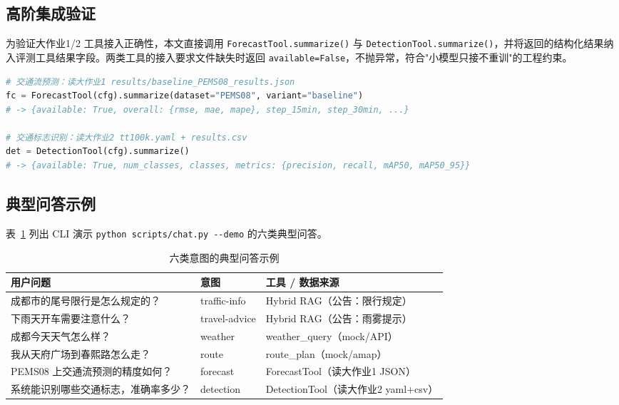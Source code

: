 \documentclass[bwprint]{report}
\begin{document}
\subsection{高阶集成验证}
为验证大作业1/2 工具接入正确性，本文直接调用 \texttt{ForecastTool.summarize()} 与 \texttt{DetectionTool.summarize()}，并将返回的结构化结果纳入评测工具结果字段。两类工具的接入要求文件缺失时返回 \texttt{available=False}，不抛异常，符合"小模型只接不重训"的工程约束。

\begin{lstlisting}[language=Python,caption={高阶工具结果接入示例（节选）}]
# 交通流预测：读大作业1 results/baseline_PEMS08_results.json
fc = ForecastTool(cfg).summarize(dataset="PEMS08", variant="baseline")
# -> {available: True, overall: {rmse, mae, mape}, step_15min, step_30min, ...}

# 交通标志识别：读大作业2 tt100k.yaml + results.csv
det = DetectionTool(cfg).summarize()
# -> {available: True, num_classes, classes, metrics: {precision, recall, mAP50, mAP50_95}}
\end{lstlisting}

\subsection{典型问答示例}
表~\ref{tab:demo-questions} 列出 CLI 演示 \texttt{python scripts/chat.py -{}-demo} 的六类典型问答。

\begin{table}[!htbp]
    \caption{六类意图的典型问答示例}
    \label{tab:demo-questions}
    \centering
    \small
    \begin{tabular}{p{}p{}p{}}
        \toprule[1.5pt]
        用户问题 & 意图 & 工具 / 数据来源 \\
        \midrule[1pt]
        成都市的尾号限行是怎么规定的？ & traffic-info  & Hybrid RAG（公告：限行规定）\\
        下雨天开车需要注意什么？ & travel-advice & Hybrid RAG（公告：雨雾提示）\\
        成都今天天气怎么样？ & weather        & weather\_query（mock/API）\\
        我从天府广场到春熙路怎么走？ & route    & route\_plan（mock/amap）\\
        PEMS08 上交通流预测的精度如何？ & forecast & ForecastTool（读大作业1 JSON）\\
        系统能识别哪些交通标志，准确率多少？ & detection & DetectionTool（读大作业2 yaml+csv）\\
        \bottomrule[1.5pt]
    \end{tabular}
\end{table}
\end{document}

